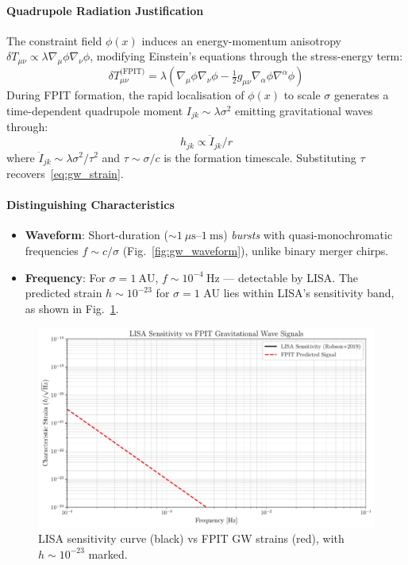 \documentclass[twocolumn]{article}
\begin{document}
	\paragraph{Quadrupole Radiation Justification} 
	The constraint field \(\phi(x)\) induces an energy-momentum anisotropy  
	\(\delta T_{\mu\nu} \propto \lambda \nabla_{\!\mu}\phi \nabla_{\!\nu}\phi\),  
	modifying Einstein's equations through the stress-energy term:  
	\begin{equation*}
		\delta T_{\mu\nu}^{\text{(FPIT)}} = \lambda \left(\nabla_{\!\mu}\phi \nabla_{\!\nu}\phi - \tfrac{1}{2}g_{\mu\nu}\nabla_\alpha\phi\nabla^\alpha\phi\right)
	\end{equation*}
	During FPIT formation, the rapid localisation of \(\phi(x)\) to scale \(\sigma\)  
	generates a time-dependent quadrupole moment \(I_{jk} \sim \lambda\sigma^2\)
	emitting gravitational waves through:  
	\begin{equation*}
		h_{jk} \propto \ddot{I}_{jk}/r
	\end{equation*}
	where \(\ddot{I}_{jk} \sim \lambda \sigma^2/\tau^2\) and \(\tau \sim \sigma/c\)  
	is the formation timescale. Substituting \(\tau\) recovers~\eqref{eq:gw_strain}.
	
	\paragraph{Distinguishing Characteristics}
	\begin{itemize}
		\item \textbf{Waveform}: Short-duration (\(\sim 1\ \mu\text{s}\)–\(1\ \text{ms}\)) \textit{bursts} with quasi-monochromatic frequencies \(f \sim c/\sigma\) (Fig.~\ref{fig:gw_waveform}), unlike binary merger chirps.  
		\item \textbf{Frequency}: For \(\sigma = 1~\text{AU}\),  
		\(f \sim 10^{-4}~\text{Hz}\) --- detectable by LISA.  
		The predicted strain \(h \sim 10^{-23}\) for \(\sigma = 1\) AU lies within LISA's sensitivity band\cite{robson2019}, as shown in Fig.~\ref{fig:lisa_sensitivity}.  
	\end{itemize}
	
	\begin{figure}[htbp]  
		\centering  
		\includegraphics[width=0.8\linewidth]{figures/lisa_curve.pdf}
		\caption{LISA sensitivity curve (black) vs FPIT GW strains (red), with $h \sim 10^{-23}$ marked.}
\label{fig:lisa_sensitivity}
	\end{figure}
	
\end{document}
